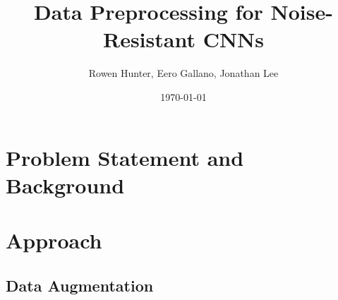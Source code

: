 \documentclass[justified]{article}
\begin{document}
  \title{Data Preprocessing for Noise-Resistant CNNs}
  \author{Rowen Hunter, Eero Gallano, Jonathan Lee}
  \date{\today}
  \maketitle

  \section{Problem Statement and Background}

  \section{Approach}

  \subsection{Data Augmentation}
\end{document}

